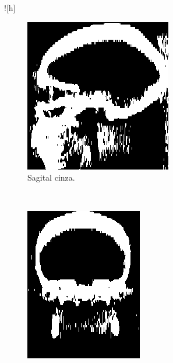 \documentclass{article}
\begin{document}
\begin{figure}![h]
    \centering
    \begin{subfigure}[b]{0.3\textwidth}
        \includegraphics[width=\textwidth]{skull/radiologist-sagital-gray.png}
        \caption{Sagital cinza.}
    \end{subfigure}
    ~
    \begin{subfigure}[b]{0.3\textwidth}
        \includegraphics[width=\textwidth]{skull/radiologist-coronal-gray.png}

\end{subfigure}
\end{figure}
\end{document}
